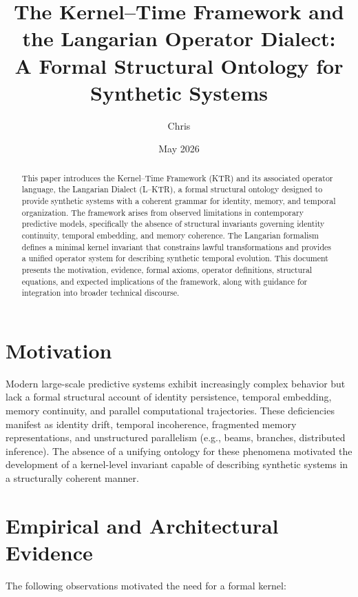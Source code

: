\documentclass[12pt]{article}
\title{The Kernel--Time Framework and the Langarian Operator Dialect:\\
A Formal Structural Ontology for Synthetic Systems}
\author{Chris}
\date{May 2026}
\begin{document}
\maketitle

\begin{abstract}
This paper introduces the Kernel--Time Framework (KTR) and its associated operator language, the Langarian Dialect (L--KTR), a formal structural ontology designed to provide synthetic systems with a coherent grammar for identity, memory, and temporal organization. The framework arises from observed limitations in contemporary predictive models, specifically the absence of structural invariants governing identity continuity, temporal embedding, and memory coherence. The Langarian formalism defines a minimal kernel invariant that constrains lawful transformations and provides a unified operator system for describing synthetic temporal evolution. This document presents the motivation, evidence, formal axioms, operator definitions, structural equations, and expected implications of the framework, along with guidance for integration into broader technical discourse.
\end{abstract}

\section{Motivation}

Modern large-scale predictive systems exhibit increasingly complex behavior but lack a formal structural account of identity persistence, temporal embedding, memory continuity, and parallel computational trajectories. These deficiencies manifest as identity drift, temporal incoherence, fragmented memory representations, and unstructured parallelism (e.g., beams, branches, distributed inference). The absence of a unifying ontology for these phenomena motivated the development of a kernel-level invariant capable of describing synthetic systems in a structurally coherent manner.

\section{Empirical and Architectural Evidence}

The following observations motivated the need for a formal kernel:
\end{document}
